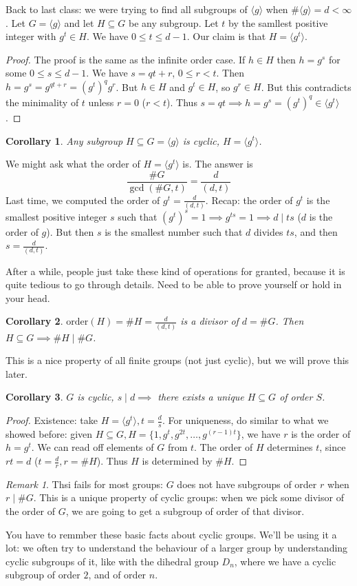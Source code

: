 \documentclass{article}
\theoremstyle{plain}
\newtheorem{corollary}{Corollary}
\theoremstyle{remark}
\newtheorem{remark}{Remark}
\begin{document}
Back to last class:
we were trying to find all subgroups of $\langle g \rangle$
when $\# \langle g \rangle = d < \infty$.
Let $G = \langle g \rangle$ and let $H \subseteq G$ be any subgroup.
Let $t$ by the samllest positive integer with $g^{t} \in H$.
We have $0 \leq t \leq d-1$.
Our claim is that $H = \langle g^{t} \rangle$.
\begin{proof}
	The proof is the same as the infinite order case.
	If $h \in H$ then $h = g^s$ for some $0 \leq s \leq d-1$.
	We have $s = qt + r$, $0 \leq r < t$.
	Then $h = g^s = g^{qt + r} = (g^t)^qg^r$.
	But $h \in H$ and $g^t \in H$, so $g^r \in H$.
	But this contradicts the minimality of $t$ unless $r = 0$ ($r < t$).
	Thus $s = qt \implies h = g^s = (g^t)^q \in \langle g^t \rangle$.
\end{proof}
\begin{corollary}
	Any subgroup $H \subseteq G = \langle g \rangle$ is cyclic, $H = \langle g^t \rangle$.
\end{corollary}
We might ask what the order of $H = \langle g^t \rangle$ is.
The answer is
\[
	\frac{\#G}{\gcd(\#G,t)} = \frac{d}{(d,t)}
\]
Last time, we computed the order of $g^t = \frac{d}{(d,t)}$.
Recap: the order of $g^t$ is the smallest positive integer $s$
such that $(g^t)^s = 1 \implies g^{ts} = 1 \implies d \mid ts$
($d$ is the order of $g$).
But then $s$ is the smallest number such that $d$ divides $ts$,
and then $s = \frac{d}{(d,t)}$.

After a while, people just take these kind of operations for granted,
because it is quite tedious to go through details.
Need to be able to prove yourself or hold in your head.
\begin{corollary}
	$\mathrm{order}(H) = \#H = \frac{d}{(d,t)}$ is a divisor of $d = \#G$.
	Then $H \subseteq G \implies \#H \mid \#G$.
\end{corollary}
This is a nice property of all finite groups (not just cyclic),
but we will prove this later.
\begin{corollary}
	$G$ is cyclic, $s \mid d \implies$ there exists a unique
	$H \subseteq G$ of order $S$.
\end{corollary}
\begin{proof}
	Existence: take $H = \langle g^t \rangle, t = \frac{d}{s}$.
	For uniqueness, do similar to what we showed before:
	given $H \subseteq G, H = \{ 1, g^t, g^{2t}, \dots, g^{(r-1)t}\}$,
	we have $r$ is the order of $h = g^t$.
	We can read off elements of $G$ from $t$.
	The order of $H$ determines $t$,
	since $rt = d$ ($t = \frac{d}{r}, r = \# H$).
	Thus $H$ is determined by $\#H$.
\end{proof}
\begin{remark}
	Thsi fails for most groups:
	$G$ does not have subgroups of order $r$ when $r \mid \# G$.
	This is a unique property of cyclic groups:
	when we pick some divisor of the order of $G$,
	we are going to get a subgroup of order of that divisor.
\end{remark}
You have to remmber these basic facts about cyclic groups.
We'll be using it a lot:
we often try to understand the behaviour of a larger group
by understanding cyclic subgroups of it,
like with the dihedral group $D_n$, where we have a cyclic subgroup of order $2$,
and of order $n$.
\end{document}
